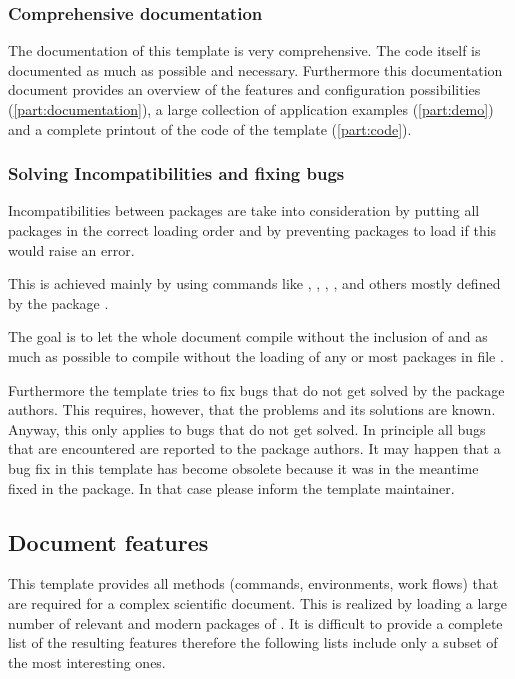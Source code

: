 \subsubsection{Comprehensive documentation}
\label{sec:doc:features:template:doc(template)}
The documentation of this template is very comprehensive. The code itself is documented as much as possible and necessary. Furthermore this documentation document provides an overview of the features and configuration possibilities (\cref{part:documentation}), a large collection of \latex application examples (\cref{part:demo}) and a complete printout of the code of the template (\cref{part:code}).

\subsubsection{Solving Incompatibilities and fixing bugs}
\label{sec:doc:features:template:bugs}
Incompatibilities between packages are take into consideration by putting all packages in the correct loading order and by preventing packages to load if this would raise an error.

This is achieved mainly by using commands like , , , ,  and others mostly defined by the package . 

The goal is to let the whole document compile without the inclusion of  and as much as possible to compile without the loading of any or most packages in file .

Furthermore the template tries to fix bugs that do not get solved by the package authors. This requires, however, that the problems and its solutions are known. Anyway, this only applies to bugs that do not get solved. In principle all bugs that are encountered are reported to the package authors.
It may happen that a bug fix in this template has become obsolete because it was in the meantime fixed in the package. In that case please inform the template maintainer.

\subsection{Document features}
\label{sec:doc:features:doc}
This template provides all methods (commands, environments, work flows) that are required for a complex scientific document. This is realized by loading a large number of relevant and modern packages of \latex. It is difficult to provide a complete list of the resulting features therefore the following lists include only a subset of the most interesting ones.

